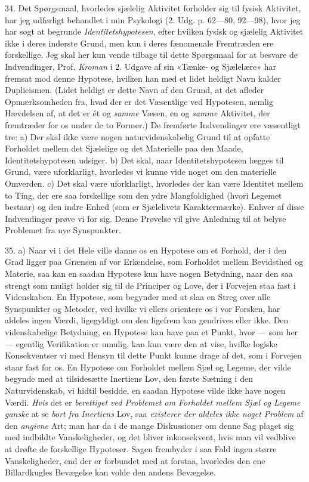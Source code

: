 \documentclass[12pt,a4paper,openany]{book}
\newcommand{\opage}[1]{\marginnote{\footnotesize\textit{[#1]}}}
\begin{document}
34. Det Spørgsmaal, hvorledes sjælelig Aktivitet forholder sig til fysisk
Aktivitet, har jeg udførligt behandlet i min Psykologi (2. Udg. p. 62---80,
92---98), hvor jeg har søgt at begrunde \emph{Identitetshypotesen}, efter
hvilken fysisk og sjælelig Aktivitet ikke i deres inderste Grund, men kun i
deres fænomenale Fremtræden ere forskellige. Jeg skal her kun vende tilbage til
dette Spørgsmaal for at besvare de Indvendinger, Prof. \emph{Kroman} i 2.
Udgave af sin «Tænke- og Sjælelære» har fremsat mod denne Hypotese, hvilken han
med et lidet heldigt Navn kalder Duplicismen. (Lidet heldigt er dette Navn af
den Grund, at det afleder Opmærksomheden fra, hvad der er det Væsentlige ved
Hypotesen, nemlig Hævdelsen af, at det er ét og \emph{samme} Væsen, en og
\emph{samme} Aktivitet, der fremtræder for os under de to Former.) De fremførte
Indvendinger ere væsentligt tre: a) Der skal ikke være nogen naturvidenskabelig
Grund til at opfatte Forholdet mellem det Sjælelige og det Materielle paa den
Maade, Identitetshypotesen udsiger. b) Det skal, naar Identitetshypotesen
lægges til Grund, være uforklarligt, hvorledes vi kunne vide noget om den
materielle Omverden. c) Det skal være uforklarligt, hvorledes der kan være
Identitet mellem to Ting, der ere saa forskellige som den ydre Mangfoldighed
(hvori Legemet bestaar) og
\setcounter{footnote}{0}%
\opage{82}den indre Enhed (som er Sjælelivets Karaktermærke). Enhver af disse
Indvendinger prøve vi for sig. Denne Prøvelse vil give Anledning til at belyse
Problemet fra nye Synspunkter.

35. a) Naar vi i det Hele ville danne os en Hypotese om et Forhold, der i den
Grad ligger paa Grænsen af vor Erkendelse, som Forholdet mellem Bevidsthed og
Materie, saa kan en saadan Hypotese kun have nogen Betydning, naar den saa
strengt som muligt holder sig til de Principer og Love, der i Forvejen staa
fast i Videnskaben. En Hypotese, som begynder med at slaa en Streg over alle
Synspunkter og Metoder, ved hvilke vi ellers orientere os i vor Forsken, har
aldeles ingen Værdi, ligegyldigt om den ligefrem kan gendrives eller ikke. Den
videnskabelige Betydning, en Hypotese kan have paa et Punkt, hvor --- som her
--- egentlig Verifikation er umulig, kan kun være den at vise, hvilke logiske
Konsekventser vi med Hensyn til dette Punkt kunne drage af det, som i Forvejen
staar fast for os. En Hypotese om Forholdet mellem Sjæl og Legeme, der vilde
begynde med at tilsidesætte Inertiens Lov, den første Sætning i den
Naturvidenskab, vi hidtil besidde, en saadan Hypotese vilde ikke have nogen
Værdi. \emph{Hvis} det er \emph{berettiget ved Problemet om Forholdet mellem
Sjæl og Legeme ganske} at se \emph{bort fra Inertiens} Lov, saa \emph{existerer
der aldeles ikke noget Problem} af den \emph{angivne} Art; man har da i de
mange Diskussioner om denne Sag plaget sig med indbildte Vanskeligheder, og det
bliver inkonsekvent, hvis man vil vedblive at drøfte de forskellige Hypoteser.
Sagen frembyder i saa Fald ingen større Vanskeligheder, end der er forbundet
med at forstaa, hvorledes den ene Billardkugles Bevægelse kan volde den andens
Bevægelse.
\end{document}
